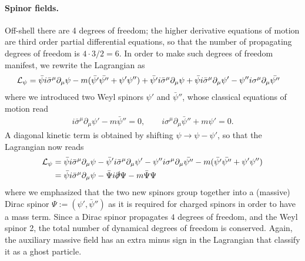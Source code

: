\paragraph{Spinor fields.} Off-shell there are 4 degrees of freedom; the higher derivative equations of motion are third order partial differential equations, so that the number of propagating degrees of freedom is $ 4 \cdot 3 / 2 = 6  $. In order to make such degrees of freedom manifest, we rewrite the Lagrangian as
\begin{equation}
\begin{split}
\Lagr_{\psi} =
&\phantom{.}	\bar \psi i \bar \sigma^\mu \partial_\mu \psi
	- m (\bar{\psi'} \bar{\psi''} + \psi' \psi'')%
	+ \bar{\psi'} i \bar \sigma^\mu  \partial_\mu \psi 	+ \bar{\psi} i \bar \sigma^\mu \partial_\mu \psi' 
	- \psi'' i \sigma^\mu \partial_\mu \bar{\psi''}
\end{split}
\end{equation}
where we introduced {two} Weyl spinors \(\psi'\) and \(\bar \psi'' \), whose classical equations of motion read
\begin{align}
i \bar \sigma^\mu \partial_\mu \psi' - m \bar \psi''  = 0
		, \hspace{2em}
i \sigma^\mu \partial_\mu \bar \psi'' +  m \psi'  = 0 .
\end{align} A diagonal kinetic term is obtained by shifting $\psi \rightarrow \psi - \psi' $, so that the Lagrangian now reads
\begin{equation}\label{lagr-HD-spinor-splitted-dof}
\begin{split}
{ \mathcal{L} }_{\psi} & 
	= \bar \psi   i \bar \sigma^\mu \partial_\mu \psi 
	- \bar \psi' i \bar \sigma^\mu \partial_\mu \psi' 
	- \psi'' i \sigma^\mu \partial_\mu \bar{\psi''}
	- m (\bar{\psi'} \bar{\psi''} + \psi' \psi'')
\\
&
	=  \bar \psi   i \bar \sigma^\mu \partial_\mu \psi 
	- \bar \Psi i \slashed{\partial} \Psi
	- m \bar \Psi \Psi
\end{split}
\end{equation}
where we emphasized that the two new spinors group together into a (massive) Dirac spinor $\Psi := (\psi' , \bar \psi'')$ as it is required for charged spinors in order to have a mass term.  Since a Dirac spinor propagates $4$ degrees of freedom, and the Weyl spinor 2, the total number of dynamical degrees of freedom is conserved.
Again, the auxiliary massive field has an extra minus sign in the Lagrangian that classify it as a ghost particle.






